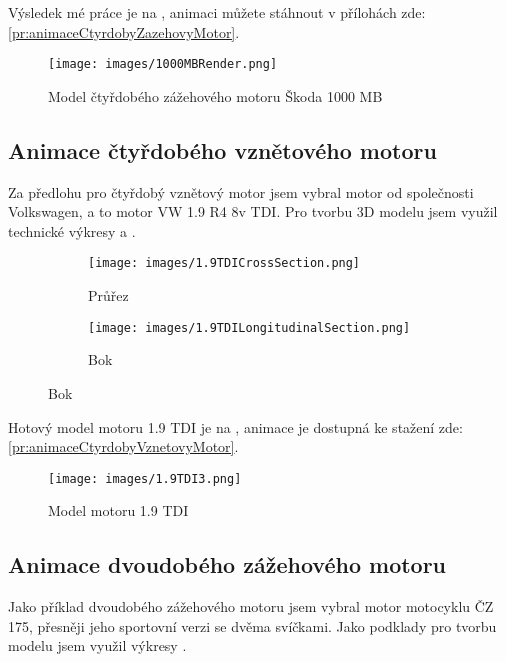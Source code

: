 {Výsledek mé práce je na , animaci můžete stáhnout v přílohách zde: \ref{pr:animaceCtyrdobyZazehovyMotor}.}

\begin{figure}[H]
    \centering
    \texttt{[image: images/1000MBRender.png]}
    \caption{Model čtyřdobého zážehového motoru Škoda 1000 MB \jaObr}
    \label{obr:1000MBRender}
\end{figure}
\newpage

\subsection{Animace čtyřdobého vznětového motoru}
{Za předlohu pro čtyřdobý vznětový motor jsem vybral motor od společnosti Volkswagen, a to motor VW 1.9 R4 8v TDI. Pro tvorbu 3D modelu jsem využil technické výkresy  a .}
\cite{VWGAG:RealizingFutureTrendsInDieselEngineDevelopment}

\begin{figure}[H]
    \centering
    \begin{subfigure}{.5\textwidth}
        \centering
        \texttt{[image: images/1.9TDICrossSection.png]}
        \caption{Průřez}
        \label{obr:1.9TDIvykresyPrurez}
    \end{subfigure}%
    \begin{subfigure}{.5\textwidth}
        \centering
        \texttt{[image: images/1.9TDILongitudinalSection.png]}
        \caption{Bok}
        \label{obr:1.9TDIvykresyBok}
    \end{subfigure}
\end{figure}

{Hotový model motoru 1.9 TDI je na , animace je dostupná ke stažení zde: \ref{pr:animaceCtyrdobyVznetovyMotor}.}

\begin{figure}[H]
    \centering
    \texttt{[image: images/1.9TDI3.png]}
    \caption{Model motoru 1.9 TDI \jaObr}
    \label{obr:1.9TDImodel}
\end{figure}

\newpage

\subsection{Animace dvoudobého zážehového motoru}
{Jako příklad dvoudobého zážehového motoru jsem vybral motor motocyklu ČZ 175, přesněji jeho sportovní verzi se dvěma svíčkami. Jako podklady pro tvorbu modelu jsem využil výkresy .}
\cite{MZ:CZ175}

